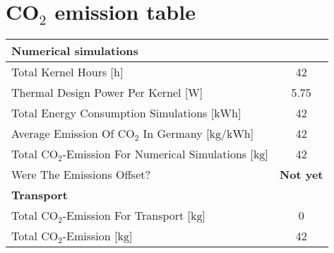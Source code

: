 \documentclass[twocolumn,superscriptaddress,nofootinbib]{revtex4-2}
\begin{document}
\section{CO\texorpdfstring{$_2$}{2} emission table}
    \begin{center}
    \begin{tabular}[b]{l c}
    \hline
    \textbf{Numerical simulations} & \\
    \hline
    Total Kernel Hours [$\mathrm{h}$]& 42\\
    Thermal Design Power Per Kernel [$\mathrm{W}$]& 5.75\\
    Total Energy Consumption Simulations [$\mathrm{kWh}$] & 42\\
    Average Emission Of CO$_2$ In Germany [$\mathrm{kg/kWh}$]& 42\\
    Total CO$_2$-Emission For Numerical Simulations [$\mathrm{kg}$] & 42\\
    Were The Emissions Offset? & \textbf{Not yet}\\
    \hline
    \textbf{Transport} & \\
    \hline
    Total CO$_2$-Emission For Transport [$\mathrm{kg}$] & 0\\
    \hline
    Total CO$_2$-Emission [$\mathrm{kg}$] & 42\\
    \hline
    \end{tabular}
    \end{center}

% 
\end{document}
